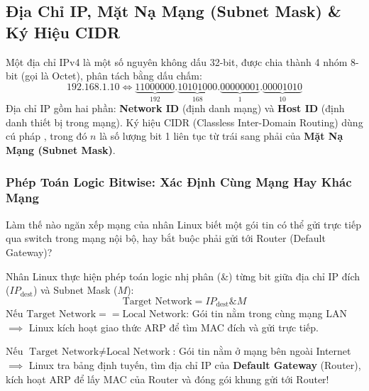 \subsection{Địa Chỉ IP, Mặt Nạ Mạng (Subnet Mask) \& Ký Hiệu CIDR}
\begin{definition}
Một địa chỉ IPv4 là một số nguyên không dấu 32-bit, được chia thành 4 nhóm 8-bit (gọi là Octet), phân tách bằng dấu chấm:
\begin{equation*}
\text{192.168.1.10} \iff \underbrace{11000000}_{192} . \underbrace{10101000}_{168} . \underbrace{00000001}_{1} . \underbrace{00001010}_{10}
\end{equation*}
Địa chỉ IP gồm hai phần: \textbf{Network ID} (định danh mạng) và \textbf{Host ID} (định danh thiết bị trong mạng).
Ký hiệu CIDR (Classless Inter-Domain Routing) dùng cú pháp , trong đó $n$ là số lượng bit 1 liên tục từ trái sang phải của \textbf{Mặt Nạ Mạng (Subnet Mask)}.
\end{definition}

\subsubsection{Phép Toán Logic Bitwise: Xác Định Cùng Mạng Hay Khác Mạng}
Làm thế nào ngăn xếp mạng của nhân Linux biết một gói tin có thể gửi trực tiếp qua switch trong mạng nội bộ, hay bắt buộc phải gửi tới Router (Default Gateway)? 

Nhân Linux thực hiện phép toán logic nhị phân  (\&) từng bit giữa địa chỉ IP đích ($IP_{\text{dest}}$) và Subnet Mask ($M$):
\begin{equation}
\text{Target Network} = IP_{\text{dest}} \mathbin{\&} M
\end{equation}
Nếu $\text{Target Network} == \text{Local Network}$: Gói tin nằm trong cùng mạng LAN $\implies$ Linux kích hoạt giao thức ARP để tìm MAC đích và gửi trực tiếp.

Nếu $\text{Target Network} \neq \text{Local Network}$: Gói tin nằm ở mạng bên ngoài Internet $\implies$ Linux tra bảng định tuyến, tìm địa chỉ IP của \textbf{Default Gateway} (Router), kích hoạt ARP để lấy MAC của Router và đóng gói khung gửi tới Router!

